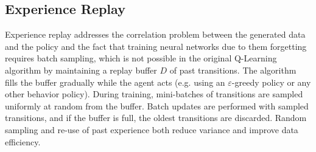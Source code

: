 \documentclass[11pt,a4paper]{article}
\begin{document}
\clearpage
\subsection{Experience Replay}
Experience replay addresses the correlation problem between the generated data
and the policy and the fact that training neural networks due to them
forgetting requires batch sampling, which is not possible in the original
Q-Learning algorithm by maintaining a replay buffer $D$ of past transitions.
The algorithm fills the buffer gradually while the agent acts (e.g. using an
$\varepsilon$-greedy policy or any other behavior policy). During training, mini-batches of transitions are
sampled uniformly at random from the buffer. Batch updates are performed
with sampled transitions, and if the buffer is full, the oldest transitions
are discarded. Random sampling and re-use of past experience both reduce
variance and improve data efficiency.
\end{document}
